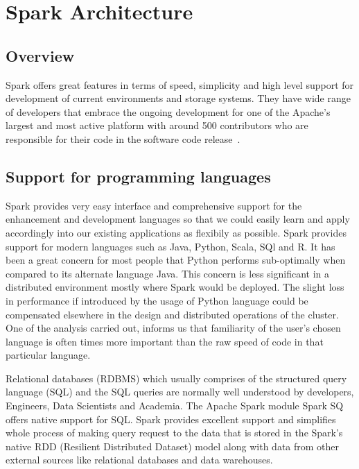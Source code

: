 \section{Spark Architecture}



\subsection{Overview}
Spark offers great features in terms of speed, simplicity and high level support
 for development of current environments and storage systems. They have wide 
 range of developers that embrace the ongoing development for one of the 
 Apache's largest and most active platform with around 500 contributors who are 
 responsible for their code in the 
 software code release~\cite{hid-sp18-410-spark-architecture}.

\subsection{Support for programming languages}
Spark provides very easy interface and comprehensive support for the enhancement
 and development languages so that we could easily learn and apply accordingly 
 into our existing applications as flexibily as possible.
Spark provides support for modern languages such as Java, Python, Scala, SQl and
 R. It has been a great concern for most people that Python performs 
 sub-optimally when compared to its alternate language Java. This concern is 
 less significant in a distributed environment mostly where Spark would be 
 deployed. The slight loss in performance if introduced by the usage of Python 
 language could be compensated elsewhere in the design and distributed 
 operations of the cluster. One of the analysis carried out, informs us that 
 familiarity of the user's chosen language is often times more important than 
 the raw speed of code in that particular language.

Relational databases (RDBMS) which usually comprises of the structured query 
language (SQL) and the SQL queries are normally well understood by developers, 
Engineers, Data Scientists and Academia. The Apache Spark module Spark SQ 
offers native support for SQL. Spark provides excellent support and simplifies 
whole process of making query request to the data that is stored in the Spark's 
native RDD (Resilient Distributed Dataset) model along with data from other 
external sources like relational databases and data warehouses.
 
